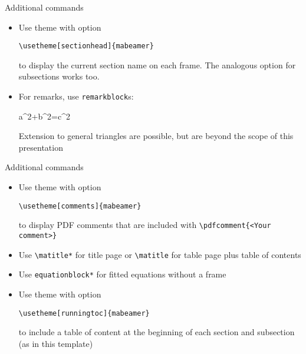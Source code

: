 \documentclass{beamer}
\begin{document}
\begin{frame}[fragile]{Additional commands}
\begin{itemize}
	\item Use theme with option
	\begin{lstlisting}
\usetheme[sectionhead]{mabeamer}
	\end{lstlisting}
	to display the current section name on each frame. The analogous option for subsections works too.

	\item For remarks, 	use \texttt{remarkblock}s:
        \begin{equationblock}
		a^2+b^2=c^2
	\end{equationblock}
	\begin{remarkblock}
		\centering Extension to general triangles are possible, but are beyond the scope of this presentation
	\end{remarkblock}
\end{itemize}
\end{frame}
\begin{frame}[fragile]{Additional commands}
\begin{itemize}
	\item Use theme with option
	\begin{lstlisting}
\usetheme[comments]{mabeamer}
	\end{lstlisting}
	to display PDF comments that are included with \verb||
	\pdfcomment{<Your comment>}
	\item Use \verb|\matitle*| for title page or \verb|\matitle| for table page plus table of contents
	\item Use \verb|equationblock*| for fitted equations without a frame
	\item Use theme with option
	\begin{lstlisting}
\usetheme[runningtoc]{mabeamer}
	\end{lstlisting}
	to include a table of content at the beginning of each section and subsection (as in this template)
\end{itemize}
\end{frame}
\end{document}

